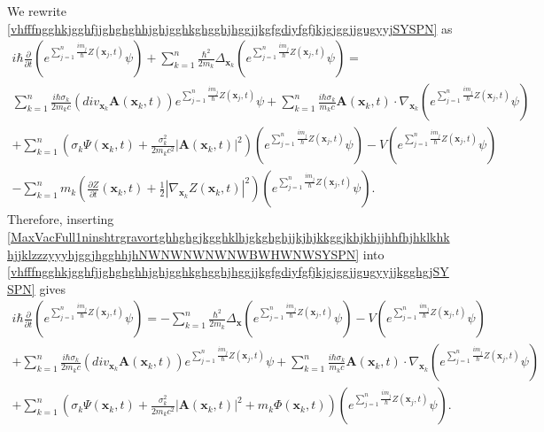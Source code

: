 \documentclass{article}
\theoremstyle{definition}
\theoremstyle{remark}
\renewcommand{\vec}[1]{\mathbf{#1}}
\newcommand{\er}{\eqref}
\newcommand{\er}{\eqref}
\begin{document}
We rewrite
\er{vhfffngghkjgghfjjghghghhjghjgghkghgghjhggjjkgfgdiyfgfjkjgjggjjgugyyjSYSPN}
as
\begin{multline}\label{vhfffngghkjgghfjjghghghhjghjgghkghgghjhggjjkgfgdiyfgfjkjgjggjjgugyyjjkgghgjSYSPN}
i\hbar\frac{\partial}{\partial
t}\left(e^{\sum_{j=1}^{n}\frac{im_j}{\hbar}Z(\vec
x_j,t)}\psi\right)+\sum_{k=1}^{n}\frac{\hbar^2}{2m_k}\Delta_{\vec
x_k}\left(e^{\sum_{j=1}^{n}\frac{im_j}{\hbar}Z(\vec
x_j,t)}\psi\right)=\\ \sum_{k=1}^{n}\frac{
i\hbar\sigma_k}{2m_kc}\left(div_{\vec x_k}\vec A(\vec
x_k,t)\right)e^{\sum_{j=1}^{n}\frac{im_j}{\hbar}Z(\vec x_j,t)}\psi+
\sum_{k=1}^{n}\frac{ i\hbar\sigma_k}{m_kc}\vec A(\vec
x_k,t)\cdot\nabla_{\vec
x_k}\left(e^{\sum_{j=1}^{n}\frac{im_j}{\hbar}Z(\vec
x_j,t)}\psi\right)
\\+\sum_{k=1}^{n}\left(\sigma_k\Psi(\vec
x_k,t)+\frac{\sigma^2_k}{2m_kc^2}\left|\vec A(\vec
x_k,t)\right|^2\right)\left(e^{\sum_{j=1}^{n}\frac{im_j}{\hbar}Z(\vec
x_j,t)}\psi\right)-V\left(e^{\sum_{j=1}^{n}\frac{im_j}{\hbar}Z(\vec
x_j,t)}\psi\right)\\-\sum_{k=1}^{n}m_k\left(\frac{\partial
Z}{\partial t}(\vec x_k,t)+\frac{1}{2}\left|\nabla_{\vec x_k}Z(\vec
x_k,t)\right|^2\right)\left(e^{\sum_{j=1}^{n}\frac{im_j}{\hbar}Z(\vec
x_j,t)}\psi\right).
\end{multline}
Therefore, inserting
\er{MaxVacFull1ninshtrgravortghhghgjkgghklhjgkghghjjkjhjkkggjkhjkhjjhhfhjhklkhkhjjklzzzyyyhjggjhgghhjhNWNWNWNWNWBWHWNWSYSPN}
into
\er{vhfffngghkjgghfjjghghghhjghjgghkghgghjhggjjkgfgdiyfgfjkjgjggjjgugyyjjkgghgjSYSPN}
gives
\begin{multline}\label{vhfffngghkjgghfjjghghghhjghjgghkghgghjhggjjkgfgdiyfgfjkjgjggjjgugyyjjkgghgjjhhjkkSYSPN}
i\hbar\frac{\partial}{\partial
t}\left(e^{\sum_{j=1}^{n}\frac{im_j}{\hbar}Z(\vec
x_j,t)}\psi\right)=-\sum_{k=1}^{n}\frac{\hbar^2}{2m_k}\Delta_{\vec
x}\left(e^{\sum_{j=1}^{n}\frac{im_j}{\hbar}Z(\vec
x_j,t)}\psi\right)-V\left(e^{\sum_{j=1}^{n}\frac{im_j}{\hbar}Z(\vec
x_j,t)}\psi\right)
\\+\sum_{k=1}^{n}\frac{ i\hbar\sigma_k}{2m_kc}\left(div_{\vec x_k}\vec
A(\vec x_k,t)\right)e^{\sum_{j=1}^{n}\frac{im_j}{\hbar}Z(\vec
x_j,t)}\psi +\sum_{k=1}^{n}\frac{ i\hbar\sigma_k}{m_kc}\vec A(\vec
x_k,t)\cdot\nabla_{\vec
x_k}\left(e^{\sum_{j=1}^{n}\frac{im_j}{\hbar}Z(\vec
x_j,t)}\psi\right)\\
+\sum_{k=1}^{n}\left(\sigma_k\Psi(\vec
x_k,t)+\frac{\sigma^2_k}{2m_kc^2}\left|\vec A(\vec
x_k,t)\right|^2+m_k\Phi(\vec
x_k,t)\right)\left(e^{\sum_{j=1}^{n}\frac{im_j}{\hbar}Z(\vec
x_j,t)}\psi\right).
\end{multline}
\end{document}
